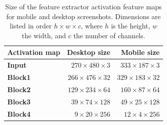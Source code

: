 \begin{table}
    \centering
    \begin{tabular}{lrr}
        \textbf{Activation map} & \textbf{Desktop size} & \textbf{Mobile size}\\\hline
        \textbf{Input} & $270\times480\times3$ & $333\times187\times3$\\
        \textbf{Block1} & $266\times476\times32$ & $329\times183\times32$\\
        \textbf{Block2} & $129\times234\times64$ & $160\times87\times64$\\
        \textbf{Block3} & $39\times74\times128$ & $49\times25\times128$\\
        \textbf{Block4} & $9\times20\times256$ & $12\times4\times256$\\
    \end{tabular}
    \caption[Size of feature extractor activation maps]{Size of the feature extractor activation feature maps for mobile and desktop screenshots. Dimensions are listed in order $h\times w\times c$, where $h$ is the height, $w$ the width, and $c$ the number of channels.}
    \label{tab:activationmaptensors}
\end{table}

